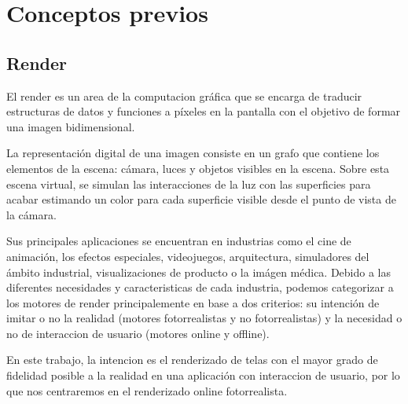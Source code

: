 \chapter{Conceptos previos}

\section{Render}
    El render es un area de la computacion gr\'afica que se encarga de traducir estructuras de datos y funciones a p\'ixeles en la pantalla
    con el objetivo de formar una imagen bidimensional.
    
    La representaci\'on digital de una imagen consiste en un grafo que contiene los elementos de la escena: c\'amara, luces y objetos visibles en
    la escena. Sobre esta escena virtual, se simulan las interacciones de la luz con las superficies para acabar estimando un color para cada
    superficie visible desde el punto de vista de la c\'amara.

    Sus principales aplicaciones se encuentran en industrias como el cine de animaci\'on, los efectos especiales,
    videojuegos, arquitectura, simuladores del \'ambito industrial, visualizaciones de producto o la im\'agen m\'edica.
    Debido a las diferentes necesidades y caracteristicas de cada industria, podemos categorizar a los motores de render
    principalemente en base a dos criterios: su intenci\'on de imitar o no la realidad (motores fotorrealistas y no
    fotorrealistas) y la necesidad o no de interaccion de usuario (motores online y offline).

    En este trabajo, la intencion es el renderizado de telas con el mayor grado de fidelidad posible a la realidad en una
    aplicaci\'on con interaccion de usuario, por lo que nos centraremos en el renderizado online fotorrealista.


